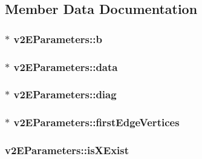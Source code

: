 \subsection{Member Data Documentation}
\hypertarget{structv2EParameters_ac0a7ddfe8902e7df101f0285ebc065a2}{
\subsubsection[{b}]{$\ast$ {\bf v2EParameters::b}}}
\label{structv2EParameters_ac0a7ddfe8902e7df101f0285ebc065a2}
\hypertarget{structv2EParameters_a10bb380921e17e9a54562e88bb6d6dcf}{
\subsubsection[{data}]{$\ast$ {\bf v2EParameters::data}}}
\label{structv2EParameters_a10bb380921e17e9a54562e88bb6d6dcf}
\hypertarget{structv2EParameters_a514a501f701f14d7889c215c1524a451}{
\subsubsection[{diag}]{$\ast$ {\bf v2EParameters::diag}}}
\label{structv2EParameters_a514a501f701f14d7889c215c1524a451}
\hypertarget{structv2EParameters_a61d2d7370ade2dea0171ed268cac2167}{
\subsubsection[{firstEdgeVertices}]{$\ast$ {\bf v2EParameters::firstEdgeVertices}}}
\label{structv2EParameters_a61d2d7370ade2dea0171ed268cac2167}
\hypertarget{structv2EParameters_a95ab8c79b3944c72d11a99d0f025a321}{
\subsubsection[{isXExist}]{ {\bf v2EParameters::isXExist}}}
